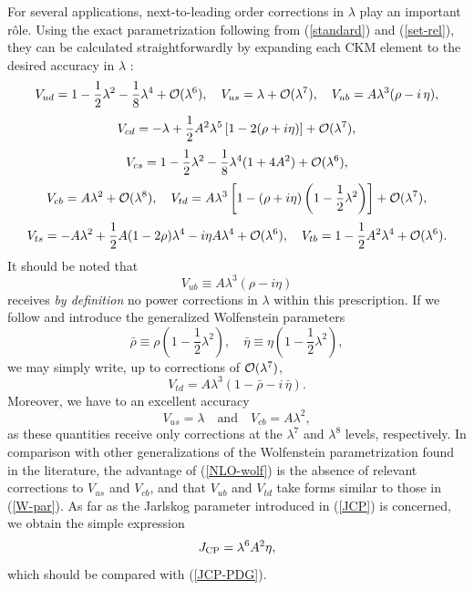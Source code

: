 \documentclass[11pt]{cernrep}
\begin{document}
For several applications, next-to-leading order corrections in $\lambda$ 
play an important r\^ole. Using the exact parametrization following from 
(\ref{standard}) and (\ref{set-rel}), they can be calculated straightforwardly 
by expanding each CKM element to the desired accuracy in 
$\lambda$ \cite{blo,Brev01}:
\begin{displaymath}
V_{ud}=1-\frac{1}{2}\lambda^2-\frac{1}{8}\lambda^4+{\cal O}(\lambda^6),\quad
V_{us}=\lambda+{\cal O}(\lambda^7),\quad
V_{ub}=A\lambda^3(\rho-i\,\eta),
\end{displaymath}
\begin{displaymath}
V_{cd}=-\lambda+\frac{1}{2}A^2\lambda^5\left[1-2(\rho+i\eta)\right]+
{\cal O}(\lambda^7),
\end{displaymath}
\begin{equation}\label{NLO-wolf}
V_{cs}=1-\frac{1}{2}\lambda^2-\frac{1}{8}\lambda^4(1+4A^2)+
{\cal O}(\lambda^6),
\end{equation}
\begin{displaymath}
V_{cb}=A\lambda^2+{\cal O}(\lambda^8),\quad
V_{td}=A\lambda^3\left[1-(\rho+i\eta)\left(1-\frac{1}{2}\lambda^2\right)
\right]+{\cal O}(\lambda^7),
\end{displaymath}
\begin{displaymath}
V_{ts}=-A\lambda^2+\frac{1}{2}A(1-2\rho)\lambda^4-i\eta A\lambda^4
+{\cal O}(\lambda^6),\quad
V_{tb}=1-\frac{1}{2}A^2\lambda^4+{\cal O}(\lambda^6).
\end{displaymath}
It should be noted that 
\begin{equation}
V_{ub}\equiv A\lambda^3(\rho-i\eta)
\end{equation}
receives {\it by definition} no power corrections in $\lambda$ within
this prescription. If we follow \cite{blo} and introduce the generalized
Wolfenstein parameters
\begin{equation}\label{rho-eta-bar}
\bar\rho\equiv\rho\left(1-\frac{1}{2}\lambda^2\right),\quad
\bar\eta\equiv\eta\left(1-\frac{1}{2}\lambda^2\right),
\end{equation}
we may simply write, up to corrections of ${\cal O}(\lambda^7)$,
\begin{equation}\label{Vtd-expr}
V_{td}=A\lambda^3(1-\bar\rho-i\,\bar\eta).
\end{equation}
Moreover, we have to an excellent accuracy
\begin{equation}\label{Def-A}
V_{us}=\lambda\quad \mbox{and}\quad 
V_{cb}=A\lambda^2,
\end{equation}
as these quantities receive only corrections at the $\lambda^7$ and
$\lambda^8$ levels, respectively. In comparison with other generalizations
of the Wolfenstein parametrization found in the literature, the advantage
of (\ref{NLO-wolf}) is the absence of relevant corrections to $V_{us}$
and $V_{cb}$, and that $V_{ub}$ and $V_{td}$ take forms similar to those 
in (\ref{W-par}). As far as the Jarlskog parameter introduced in
(\ref{JCP}) is concerned, we obtain the simple expression
\begin{equation}
J_{\rm CP}=\lambda^6A^2\eta,
\end{equation}
which should be compared with (\ref{JCP-PDG}).
\end{document}
